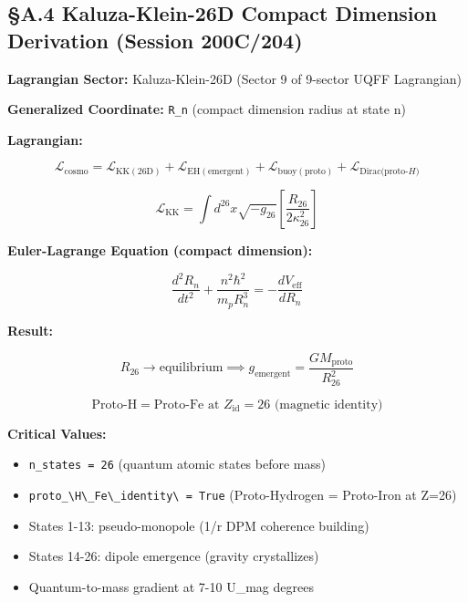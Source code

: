\documentclass[12pt,a4paper]{article}
\begin{document}
\subsection{\S{}A.4 Kaluza-Klein-26D Compact Dimension Derivation (Session 200C/204)}

\textbf{Lagrangian Sector:} Kaluza-Klein-26D (Sector 9 of 9-sector UQFF Lagrangian)

\textbf{Generalized Coordinate:} \texttt{R\_n} (compact dimension radius at state n)

\textbf{Lagrangian:}

\begin{equation}
\mathcal{L}_{\mathrm{cosmo}} = \mathcal{L}_{\mathrm{KK(26D)}} + \mathcal{L}_{\mathrm{EH(emergent)}} + \mathcal{L}_{\mathrm{buoy(proto)}} + \mathcal{L}_{\mathrm{Dirac(proto\text{-}}H)}
\end{equation}

\begin{equation}
\mathcal{L}_{\mathrm{KK}} = \int d^{26}x \sqrt{-g_{26}} \left[\frac{R_{26}}{2\kappa_{26}^2}\right]
\end{equation}

\textbf{Euler-Lagrange Equation (compact dimension):}

\begin{equation}
\boxed{\frac{d^2 R_n}{dt^2} + \frac{n^2 \hbar^2}{m_p R_n^3} = -\frac{dV_{\mathrm{eff}}}{dR_n}}
\end{equation}

\textbf{Result:}

\begin{equation}
R_{26} \to \text{equilibrium} \implies g_{\mathrm{emergent}} = \frac{G M_{\mathrm{proto}}}{R_{26}^2}
\end{equation}

\begin{equation}
\text{Proto-H} = \text{Proto-Fe at } Z_{\mathrm{id}} = 26 \text{ (magnetic identity)}
\end{equation}

\textbf{Critical Values:}

\begin{itemize}
  \item \texttt{n\_states = 26} (quantum atomic states before mass)
  \item \texttt{proto\_\textbackslash {H\textbackslash \_Fe\textbackslash \_identity\textbackslash } = True} (Proto-Hydrogen = Proto-Iron at Z=26)
  \item States 1-13: pseudo-monopole (1/r DPM coherence building)
  \item States 14-26: dipole emergence (gravity crystallizes)
  \item Quantum-to-mass gradient at 7-10 U\_mag degrees
\end{itemize}
\end{document}
